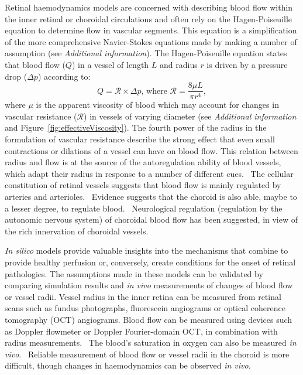 \documentclass[12pt,a4paper]{journal}
\begin{document}
Retinal haemodynamics models are concerned with describing blood flow within the inner retinal or choroidal circulations and often rely on the Hagen-Poiseuille equation to determine flow in vascular segments.
This equation is a simplification of the more comprehensive Navier-Stokes equations made by making a number of assumption (see \textit{Additional information}).
The Hagen-Poiseuille equation states that blood flow ($Q$) in a vessel of length $L$ and radius $r$ is driven by a pressure drop ($\Delta p$) according to:
\begin{equation*}
  \label{eq:Hagen-Poiseuille}
  Q = \mathcal R\times\Delta p \mbox{, where } \mathcal{R} = \frac{8\mu L}{\pi r^4},
\end{equation*}
where $\mu$ is the apparent viscosity of blood which may account for changes in vascular resistance ($\mathcal R$) in vessels of varying diameter (see \textit{Additional information} and Figure~\ref{fig:effectiveViscosity}).
The fourth power of the radius in the formulation of vascular resistance describe the strong effect that even small contractions or dilations of a vessel can have on blood flow.
This relation between radius and flow is at the source of the autoregulation ability of blood vessels, which adapt their radius in response to a number of different cues.~\cite{Kur_2012}
The cellular constitution of retinal vessels suggests that blood flow is mainly regulated by arteries and arterioles.~\cite{An_2020,Kur_2012}
Evidence suggests that the choroid is also able, maybe to a lesser degree, to regulate blood.~\cite{Polska_2007,Riva_1997}
Neurological regulation (regulation by the autonomic nervous system) of choroidal blood flow has been suggested, in view of the rich innervation of choroidal vessels.~\cite{BeharCohen_2020,Polska_2007}

\textit{In silico} models provide valuable insights into the mechanisms that combine to provide healthy perfusion or, conversely, create conditions for the onset of retinal pathologies.
The assumptions made in these models can be validated by comparing simulation results and \textit{in vivo} measurements of changes of blood flow or vessel radii.
Vessel radius in the inner retina can be measured from retinal scans such as fundus photographs, fluorescein angiograms or optical coherence tomography (OCT) angiograms.
Blood flow can be measured using devices such as Doppler flowmeter or Doppler Fourier-domain OCT, in combination with radius measurements.~\cite{DoblhoffDier_2014,Wang_2009}
The blood's saturation in oxygen can also be measured \textit{in vivo}.~\cite{Geirsdottir_2013}
Reliable measurement of blood flow or vessel radii in the choroid is more difficult, though changes in haemodynamics can be observed \textit{in vivo}.~\cite{Riva_1997,Scherm_2019}
\end{document}
